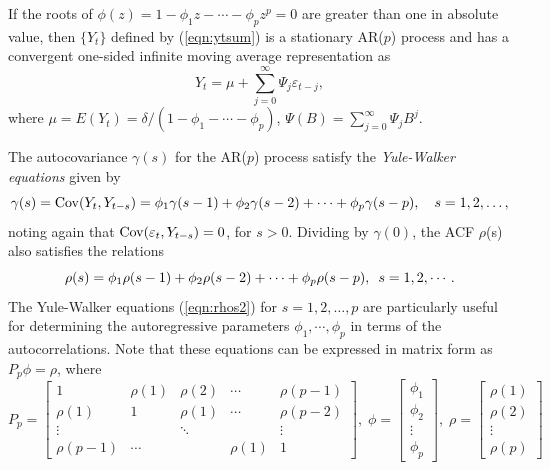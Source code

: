 \begin{result}
If the roots of $\phi(z) = 1- \phi_1z - \cdots - \phi_pz^p = 0$ are greater than one in absolute value, then $\{Y_t\}$ defined by (\ref{eqn:ytsum}) is a stationary AR($p$) process and has a convergent one-sided infinite moving average representation as
	\begin{equation}\label{eqn:ytthm}
	Y_t= \mu + \sum_{j=0}^\infty\Psi_j\varepsilon_{t-j},
	\end{equation}
where $\mu = E(Y_t) = \delta/(1 - \phi_1 - \cdots - \phi_p)$, $\Psi(B) = \sum_{j=0}^\infty\Psi_jB^j$. 
\end{result}


The autocovariance $\gamma(s)$ for the AR($p$) process satisfy the \textit{Yule-Walker equations} given by
	\begin{equation*}
	\gamma(s)= \operatorname{Cov}(Y_t,Y_{t-s})= \phi_1\gamma(s-1) + \phi_2\gamma(s-2) + \cdots + \phi_p\gamma(s-p),\quad s=1,2,\ldots,
	\end{equation*}
noting again that $\operatorname{Cov}(\varepsilon_t,Y_{t-s})= 0$, for $s>0$. Dividing by $\gamma(0)$, the ACF $\rho$(s) also satisfies the relations
	\begin{equation}\label{eqn:rhos2}
	\rho(s) = \phi_1\rho(s-1) + \phi_2\rho(s-2) + \cdots + \phi_p\rho(s-p),\enskip s=1,2,\cdots.
	\end{equation}
The Yule-Walker equations (\ref{eqn:rhos2}) for $s=1,2,\ldots,p$ are particularly useful for determining the autoregressive parameters $\phi_1,\cdots,\phi_p$ in terms of the autocorrelations. Note that these equations can be expressed in matrix form as $P_p\phi = \rho$, where
	\begin{equation}\label{eqn:matrix}
	P_p=\begin{bmatrix}
	1 & \rho(1) & \rho(2) & \cdots & \rho(p-1) \\
	\rho(1) & 1 & \rho(1) & \cdots & \rho(p-2)\\
	\vdots & & \ddots & & \vdots \\
	\rho(p-1) & \cdots & & \rho(1) & 1
	\end{bmatrix}, \;
	\phi=\begin{bmatrix} \phi_1 \\ \phi_2 \\ \vdots \\ \phi_p \end{bmatrix}, \;
	\rho=\begin{bmatrix} \rho(1) \\ \rho(2) \\ \vdots \\ \rho(p) \end{bmatrix} 
	\end{equation}
